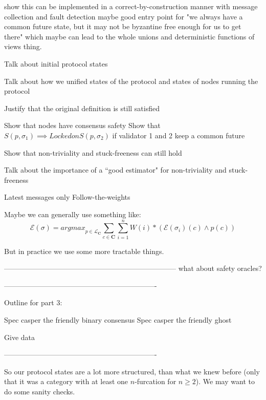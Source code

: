 \documentclass{article}
\theoremstyle{definition}
\newcommand{\cat}{
	\mathbf
}
\begin{document}
show this can be implemented in a correct-by-construction manner with message collection and fault detection
maybe good entry point for "we always have a common future state, but it may not be byzantine free enough for us to get there"
which maybe can lead to the whole unions and deterministic functions of views thing.

Talk about initial protocol states

Talk about how we unified states of the protocol and states of nodes running the protocol



Justify that the original definition is still satisfied

Show that nodes have consensus safety
Show that $S(p, \sigma_1) \implies Locked on S(p, \sigma_2)$ if validator 1 and 2 keep a common future

Show that non-triviality and stuck-freeness can still hold

Talk about the importance of a ``good estimator" for non-triviality and stuck-freeness

Latest messages only
Follow-the-weights

Maybe we can generally use something like:
$$
\mathcal{E}(\sigma) = {argmax}_{p\in \mathcal{L}_\cat{C}} \sum_{c \in \cat{C}} \sum_{i=1}^n W(i)*(\mathcal{E}(\sigma_i)(c) \land p(c))
$$ 

But in practice we use some more tractable things.

------------------------------------------------------------------------
what about safety oracles?



----------------------------------------------------------------

Outline for part 3:

Spec casper the friendly binary consensus
Spec casper the friendly ghost

Give data


----------------------------------------------------------------

\fi




\iffalse


So our protocol states are a lot more structured, than what we knew before (only that it was a category with at least one $n$-furcation for $n\geq 2$). We may want to do some sanity checks.
\end{document}

